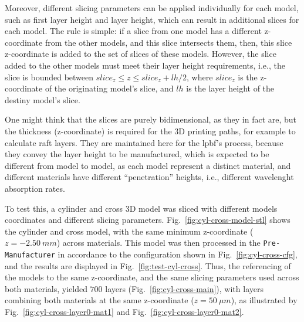Moreover, different slicing parameters can be applied individually for each
model, such as first layer height and layer height, which can result in
additional slices for each model. The rule is simple: if a slice from one model
has a different z-coordinate from the other models, and this slice intersects
them, then, this slice z-coordinate is added to the set of slices of
these models. However, the slice added to the other models must meet their layer
height requirements, i.e., the slice is bounded between $ slice_z \leq z \leq
slice_z + lh/2$, where $slice_z$ is the z-coordinate of the originating model's
slice, and $lh$ is the layer height of the destiny model's slice.

One might think that the slices are purely bidimensional, as they in fact are,
but the thickness (z-coordinate) is required for the 3D printing paths, for
example to calculate raft layers. They are maintained here for the \gls{lpbf}'s
process, because they convey the layer height to be manufactured, which is expected to be different from
model to model, as each model represent a distinct material, and different
materials have different ``penetration'' heights, i.e., different wavelenght
absorption rates.

To test this, a cylinder and cross 3D model was sliced with different models
coordinates and different slicing parameters. Fig.~\ref{fig:cyl-cross-model-stl}
shows the cylinder and cross model, with the same minimum z-coordinate ($z =
-2.50~mm$) across materials. 
This model was then processed in the \texttt{Pre-Manufacturer} in accordance to
the configuration shown in Fig.~\ref{fig:cyl-cross-cfg}, and the results are
displayed in Fig.~\ref{fig:test-cyl-cross}. Thus, the referencing of the models
to the same z-coordinate, and the same slicing parameters used across both
materials, yielded $700$ layers (Fig.~\ref{fig:cyl-cross-main}), with
layers combining both materials at the same z-coordinate ($z = 50 ~\mu m$), as
illustrated by Fig.~\ref{fig:cyl-cross-layer0-mat1} and Fig.~\ref{fig:cyl-cross-layer0-mat2}.
%
%

